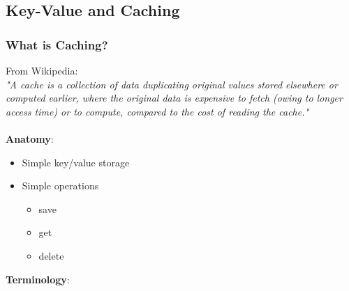 \documentclass[10pt,a4paper]{article}
\newcommand{\nline}{\\~\\}
\begin{document}
\subsection{Key-Value and Caching}
\subsubsection{What is Caching?}
From Wikipedia: \\ \textit{"A cache is a collection of data duplicating original values stored elsewhere or computed earlier, where the original data is expensive to fetch (owing to longer access time) or to compute, compared to the cost of reading the cache."} 
\nline

\textbf{Anatomy}:
\begin{itemize}
	\item Simple key/value storage
	\item Simple operations
	\begin{itemize}
		\item save
		\item get
		\item delete
	\end{itemize}
\end{itemize}
\pagebreak
\textbf{Terminology}:
\end{document}
